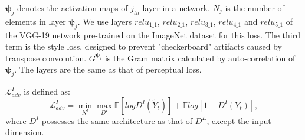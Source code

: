 $\boldsymbol{\psi}_j$ denotes the activation maps of $j_{th}$ layer in a network.
$N_j$ is the number of elements in layer $\boldsymbol{\psi}_j$. We use layers $relu_{1\_1}$, $relu_{2\_1}$, $relu_{3\_1}$, $relu_{4\_1}$ and $relu_{5\_1}$ of the VGG-19 network pre-trained on the ImageNet dataset for this loss.
The third term is the style loss, designed to prevent "checkerboard" artifacts \cite{Sajjadi_2017_ICCV} caused by transpose convolution. $G^{\boldsymbol{\psi}_j}$ is the Gram matrix calculated by auto-correlation of $\boldsymbol{\psi}_j$. The layers are the same as that of perceptual loss.

$\mathcal{L}^I_{adv}$ is defined as:
\begin{equation}
\label{eq:inp_adver}
\mathcal{L}^I_{adv}=\min\limits_{N^I} \max \limits_{D^I} \mathbb{E}[logD^I(\widetilde{Y}_t)]+\mathbb{E}log[1-D^I(Y_{t})],
\end{equation}
where $D^I$ possesses the same architecture as that of $D^E$, except the input dimension.
